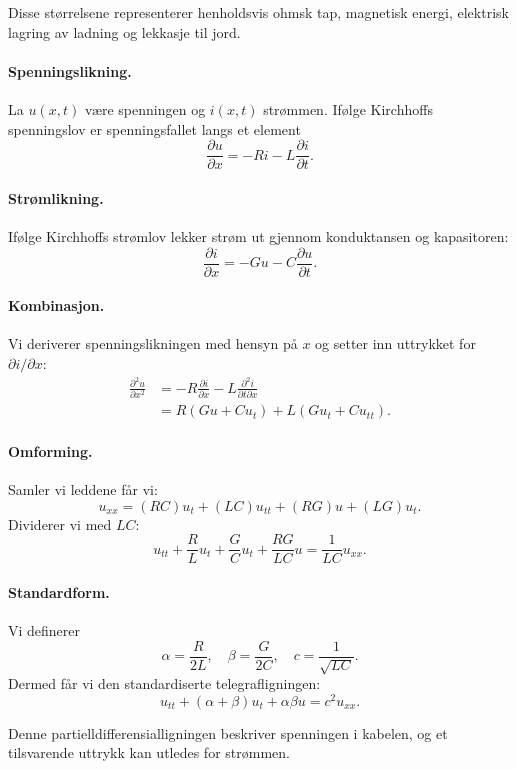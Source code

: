 Disse størrelsene representerer henholdsvis ohmsk tap, magnetisk energi, elektrisk lagring av ladning og lekkasje til jord.  

\paragraph{Spenningslikning.}  
La $u(x,t)$ være spenningen og $i(x,t)$ strømmen. Ifølge Kirchhoffs spenningslov er spenningsfallet langs et element
\begin{equation}
\frac{\partial u}{\partial x} = -R i - L \frac{\partial i}{\partial t}.
\end{equation}

\paragraph{Strømlikning.}  
Ifølge Kirchhoffs strømlov lekker strøm ut gjennom konduktansen og kapasitoren:
\begin{equation}
\frac{\partial i}{\partial x} = -G u - C \frac{\partial u}{\partial t}.
\end{equation}

\paragraph{Kombinasjon.}  
Vi deriverer spenningslikningen med hensyn på $x$ og setter inn uttrykket for $\partial i/\partial x$:
\begin{align}
\frac{\partial^2 u}{\partial x^2} 
&= -R \frac{\partial i}{\partial x} - L \frac{\partial^2 i}{\partial t \partial x} \\
&= R(G u + C u_t) + L(G u_t + C u_{tt}).
\end{align}

\paragraph{Omforming.}  
Samler vi leddene får vi:
\begin{equation}
u_{xx} = (RC) u_t + (LC) u_{tt} + (RG) u + (LG) u_t.
\end{equation}
Dividerer vi med $LC$:
\begin{equation}
u_{tt} + \frac{R}{L} u_t + \frac{G}{C} u_t + \frac{RG}{LC} u = \frac{1}{LC} u_{xx}.
\end{equation}

\paragraph{Standardform.}  
Vi definerer
\begin{equation}
\alpha = \frac{R}{2L}, \quad 
\beta = \frac{G}{2C}, \quad 
c = \frac{1}{\sqrt{LC}}.
\end{equation}
Dermed får vi den standardiserte telegrafligningen:
\begin{equation}
u_{tt} + (\alpha + \beta) u_t + \alpha \beta u = c^2 u_{xx}.
\end{equation}

Denne partielldifferensialligningen beskriver spenningen i kabelen, og et tilsvarende uttrykk kan utledes for strømmen.
